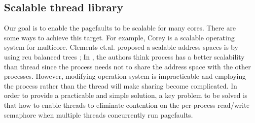 




\subsection{Scalable thread library}

Our goal is to enable the pagefaults to be scalable  for many cores.
There are some ways to achieve this target. 
For example, Corey\cite{boyd2008corey} is a scalable operating system for multicore.
Clements et.al. proposed a scalable address spaces is by using rcu balanced trees \cite{Clements2012Scalable};
In \cite{Andi2009lmulticore}, the authors think process has a better scalability than thread since the process needs not to share the address space with the other processes.
However, modifying operation system is impracticable and employing the process rather than the thread will make sharing become complicated. 
In order to provide a practicable and simple solution, a key problem to be solved is that how to enable threads to eliminate contention on the per-process read/write semaphore when multiple threads concurrently run pagefaults.





